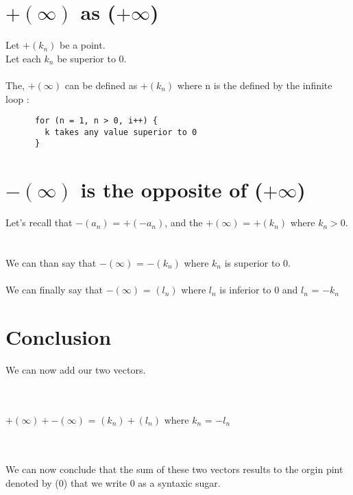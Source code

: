 \documentclass{article}
\begin{document}
  \section{$+(\infty)$ as ($+\infty$)}
    Let $+(k_n)$ be a point.
    ~\\
    Let each $k_n$ be superior to 0.
    ~\\
    ~\\
    The, $+(\infty)$ can be defined as $+(k_n)$ where n is the defined by the infinite loop :
    \begin{verbatim}
      for (n = 1, n > 0, i++) {
        k takes any value superior to 0 
      }
    \end{verbatim}
  \section{$-(\infty)$ is the opposite of ($+\infty$)}
    Let's recall that $-(a_n)$ = $+(-a_n)$, and the $+(\infty)$ = $+(k_n)$ where $k_n > 0$.
    ~\\
    ~\\
    We can than say that $-(\infty)$ = $-(k_n)$ where $k_n$ is superior to 0. 
    ~\\
    ~\\
    We can finally say that $-(\infty)$ = $(l_n)$ where $l_n$ is inferior to 0 and $l_n$ = $-k_n$
  \section{Conclusion}
    We can now add our two vectors.
    ~\\
    ~\\
    ~\\
    \centerline{
	    $+(\infty) + -(\infty)$ = $(k_n) + (l_n)$ where $k_n$ = $-l_n$
    }
    ~\\
    ~\\
    We can now conclude that the sum of these two vectors results to the orgin pint denoted by (0) that we write 0 as a syntaxic sugar.
\end{document}
